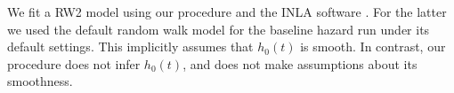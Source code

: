 \documentclass[AMA,STIX1COL,doublespace]{WileyNJD-v2}
\begin{document}
We fit a RW2 model using our procedure and the INLA software \cite{inla}. For the latter we used the default random walk model for the baseline hazard run under its default settings. This implicitly assumes that $h_{0}(t)$ is smooth. In contrast, our procedure does not infer $h_{0}(t)$, and does not make assumptions about its smoothness.

\begin{figure}[ht]
\centering
{}
\end{figure}
\end{document}
